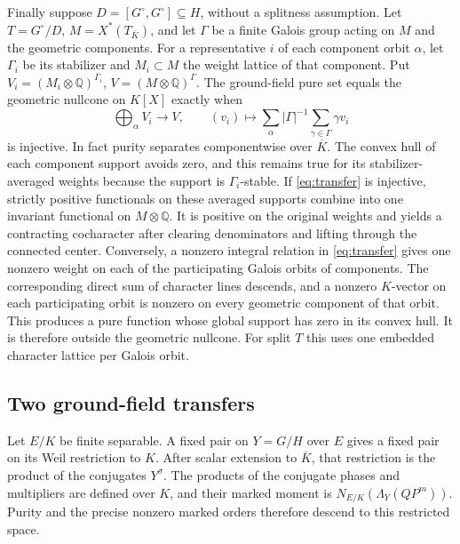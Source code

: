 \documentclass[11pt]{article}
\newcommand{\QQ}{\mathbb Q}
\begin{document}
Finally suppose \(D=[G^\circ,G^\circ]\subseteq H\), without a splitness
assumption. Let \(T=G^\circ/D\), \(M=X^*(T_{\overline K})\), and let
\(\Gamma\) be a finite Galois group acting on \(M\) and the geometric
components. For a representative \(i\) of each component orbit
\(\alpha\), let \(\Gamma_i\) be its stabilizer and \(M_i\subset M\)
the weight lattice of that component. Put
\(V_i=(M_i\otimes\QQ)^{\Gamma_i}\), \(V=(M\otimes\QQ)^\Gamma\).
The ground-field pure set equals the geometric nullcone on \(K[X]\)
exactly when
\begin{equation}\label{eq:transfer}
 \bigoplus_\alpha V_i\longrightarrow V,\qquad
 (v_i)\longmapsto\sum_\alpha|\Gamma|^{-1}
                                  \sum_{\gamma\in\Gamma}\gamma v_i
\end{equation}
is injective. In fact purity separates componentwise over
\(\overline K\). The convex hull of each component support avoids
zero, and this remains true for its stabilizer-averaged weights
because the support is \(\Gamma_i\)-stable. If \eqref{eq:transfer}
is injective, strictly positive functionals on these averaged
supports combine into one invariant functional on \(M\otimes\QQ\).
It is positive on the original weights and yields a contracting
cocharacter after clearing denominators and lifting through the
connected center. Conversely, a nonzero integral relation in
\eqref{eq:transfer} gives one nonzero weight on each of the
participating Galois orbits of components. The corresponding
direct sum of character lines descends, and a nonzero \(K\)-vector
on each participating orbit is nonzero on every geometric
component of that orbit. This produces a pure function whose
global support has zero in its convex hull. It is therefore
outside the geometric nullcone. For split \(T\) this uses one
embedded character lattice per Galois orbit.

\subsection*{Two ground-field transfers}

Let \(E/K\) be finite separable. A fixed pair on \(Y=G/H\) over \(E\)
gives a fixed pair on its Weil restriction to \(K\). After scalar
extension to \(\overline K\), that restriction is the product of
the conjugates \(Y^\sigma\). The products of the conjugate phases
and multipliers are defined over \(K\), and their marked moment
is \(N_{E/K}(\Lambda_Y(QP^m))\). Purity and the precise nonzero
marked orders therefore descend to this restricted space.
\end{document}
